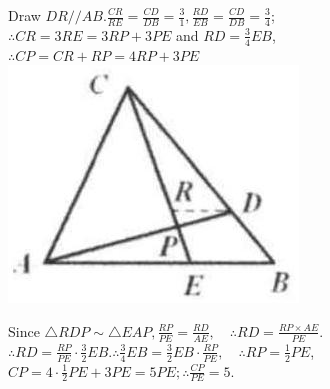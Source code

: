 \documentclass{article}
\begin{document}
Draw \(D R / / A B . \frac{C R}{R E}=\frac{C D}{D B}=\frac{3}{1}, \frac{R D}{E B}=\frac{C D}{D B}=\frac{3}{4}\);\\
\(\therefore C R=3 R E=3 R P+3 P E\) and \(R D=\frac{3}{4} E B\),\\
\(\therefore C P=C R+R P=4 R P+3 P E\)\\
\centering
\includegraphics[width=\textwidth]{images/reasoning_image_1.jpg}

Since \(\triangle R D P \sim \triangle E A P, \frac{R P}{P E}=\frac{R D}{A E}, \quad \therefore R D=\frac{R P \times A E}{P E}\).\\
\(\therefore R D=\frac{R P}{P E} \cdot \frac{3}{2} E B . \therefore \frac{3}{4} E B=\frac{3}{2} E B \cdot \frac{R P}{P E}, \quad \therefore R P=\frac{1}{2} P E\), \(C P=4 \cdot \frac{1}{2} P E+3 P E=5 P E ; \therefore \frac{C P}{P E}=5\).
\end{document}
